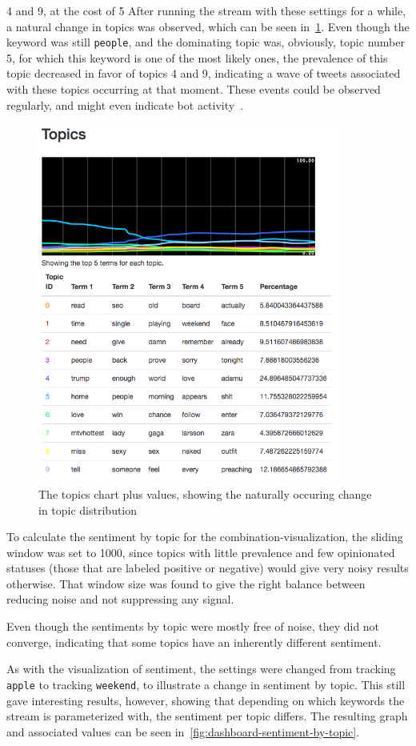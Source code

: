4 and 9, at the cost of 5
After running the stream with these settings for a while, a natural change in topics was observed, which can be seen in~\ref{fig:dashboard-topics}.
Even though the keyword was still \texttt{people}, and the dominating topic was, obviously, topic number 5,
for which this keyword is one of the most likely ones, the prevalence of this topic decreased in favor of topics 4 and 9,
indicating a wave of tweets associated with these topics occurring at that moment.
These events could be observed regularly, and might even indicate bot activity~\cite{chu2012detecting}.

\begin{figure}
    \centering
    \caption{The topics chart plus values, showing the naturally occuring change in topic distribution}
    \label{fig:dashboard-topics}
    \includegraphics[width=10cm]{../images/dashboard_topics.png}
\end{figure}


To calculate the sentiment by topic for the combination-visualization,
the sliding window was set to 1000, since topics with little prevalence and few opinionated statuses
(those that are labeled positive or negative) would give very noisy results otherwise.
That window size was found to give the right balance between reducing noise and not suppressing any signal.
\par
Even though the sentiments by topic were mostly free of noise, they did not converge,
indicating that some topics have an inherently different sentiment.
\par
As with the visualization of sentiment, %
the settings were changed from tracking \texttt{apple} to tracking \texttt{weekend}, to illustrate a change in sentiment by topic.
This still gave interesting results, however, showing that depending on which keywords the stream is parameterized with,
the sentiment per topic differs.
The resulting graph and associated values can be seen in~\ref{fig:dashboard-sentiment-by-topic}.

